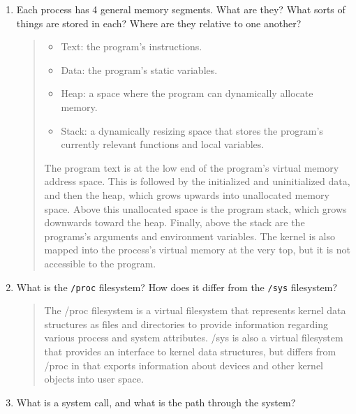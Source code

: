 \documentclass[letterpaper,10pt,onecolumn,titlepage]{article}
\begin{document}
\begin{enumerate}[itemsep=0.1 in]
\item Each process has 4 general memory segments. What are they? What sorts of things are
  stored in each? Where are they relative to one another?

\begin{quote}
  \begin{itemize}
    \item Text: the program's instructions.
    \item Data: the program's static variables.
    \item Heap: a space where the program can dynamically allocate memory.
    \item Stack: a dynamically resizing space that stores the program's currently relevant functions and local variables.
  \end{itemize}

The program text is at the low end of the program's virtual memory address space.  This is followed by the initialized and uninitialized data, and then the heap, which grows upwards into unallocated memory space.  Above this unallocated space is the program stack, which grows downwards toward the heap.  Finally, above the stack are the programs's arguments and environment variables.  The kernel is also mapped into the process's virtual memory at the very top, but it is not accessible to the program.
\end{quote}

\item What is the \texttt{/proc} filesystem? How does it differ from the \texttt{/sys}
  filesystem?

\begin{quote}
  The /proc filesystem is a virtual filesystem that represents kernel data structures as files and directories to provide information regarding various process and system attributes.  /sys is also a virtual filesystem that provides an interface to kernel data structures, but differs from /proc in that exports information about devices and other kernel objects into user space.
\end{quote}

\item What is a system call, and what is the path through the system?


\end{enumerate}
\end{document}
